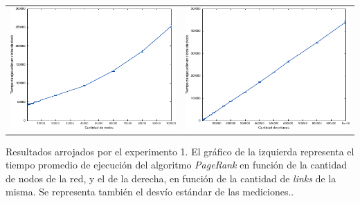             \noindent{} \begin{minipage}{\textwidth}
                \begin{center}
                    \vspace{1em}

                    \begin{tabular}{cc}
                        \includegraphics{graficos/exp1-a.pdf} & \includegraphics{graficos/exp1-b.pdf} \\
                    \end{tabular}

                    \vspace{1em}

                    Resultados arrojados por el experimento 1. El gráfico de la izquierda representa el tiempo promedio de ejecución del algoritmo \emph{PageRank} en función de la cantidad de nodos de la red, y el de la derecha, en función de la cantidad de \emph{links} de la misma. Se representa también el desvío estándar de las mediciones..

                    \vspace{1em}
                \end{center}
            \end{minipage}

